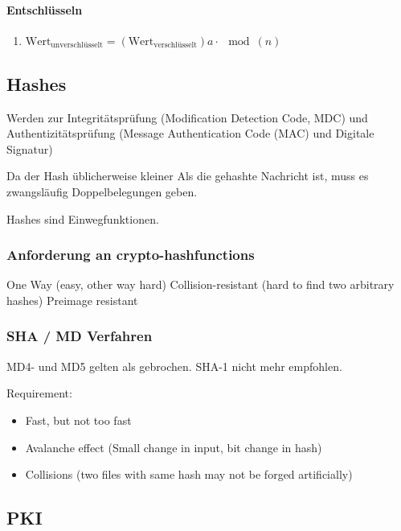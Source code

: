 \paragraph{Entschlüsseln}
\begin{enumerate}
	\item $\text{Wert}_\text{unverschlüsselt} = (\text{Wert}_\text{verschlüsselt}) a \cdot \mod(n)$
\end{enumerate}

\subsection{Hashes}

Werden zur Integritätsprüfung (Modification Detection Code, MDC) und Authentizitätsprüfung (Message Authentication Code (MAC) und Digitale Signatur)

Da der Hash üblicherweise kleiner Als die gehashte Nachricht ist, muss es zwangsläufig Doppelbelegungen geben.

Hashes sind Einwegfunktionen.

\subsubsection{Anforderung an crypto-hashfunctions}

One Way (easy, other way hard)
Collision-resistant (hard to find two arbitrary hashes)
Preimage resistant 

\subsubsection{SHA / MD Verfahren}



MD4- und MD5 gelten als gebrochen. SHA-1 nicht mehr empfohlen.

Requirement:
\begin{itemize}
	\item Fast, but not too fast
	\item Avalanche effect (Small change in input, bit change in hash)
	\item Collisions (two files with same hash may not be forged artificially)
\end{itemize}

\subsection{PKI}

